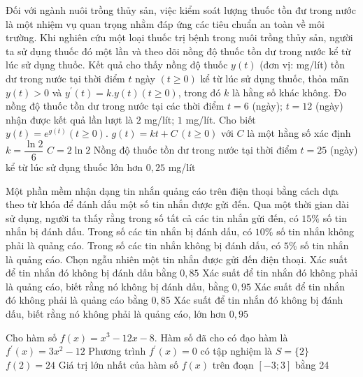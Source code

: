 \documentclass[12pt,a4paper]{article}
\begin{document}
\begin{ex}%
Đối với ngành nuôi trồng thủy sản, việc kiểm soát lượng thuốc tồn đư trong nước là một nhiệm vụ quan trọng nhằm đáp ứng các tiêu chuẩn an toàn về môi trường. Khi nghiên cứu một loại thuốc trị bệnh trong nuôi trồng thủy sản, người ta sử dụng thuốc đó một lần và theo dõi nồng độ thuốc tồn dư trong nước kể từ lúc sử dụng thuốc. Kết quả cho thấy nồng độ thuốc $y(t)$ (đơn vị: mg/lít) tồn dư trong nước tại thời điểm $t$ ngày $(t \geq 0)$ kể từ lúc sử dụng thuốc, thỏa mãn $y(t)>0$ và $y^{\prime}(t)=k .y(t)(t \geq 0)$, trong đó $k$ là hằng số khác không. Đo nồng độ thuốc tồn dư trong nước tại các thời điểm $t=6$ (ngày); $t=12$ (ngày) nhận được kết quả lần lượt là $2$ mg/lít; $1$ mg/lít. Cho biết $y(t)=e^{g(t)}(t \geq 0)$.
\choiceTF
{$g(t)=k t+C\,(t \geq 0)$ với $C$ là một hằng số xác định}
{$k=\dfrac{\ln 2}{6}$}
{$C=2 \ln 2$}
{Nồng độ thuốc tồn dư trong nước tại thời điểm $t=25$ (ngày) kể từ lúc sử dụng thuốc lớn hơn $0,25$ mg/lít}
\end{ex}

\begin{ex}%
Một phần mềm nhận dạng tin nhắn quảng cáo trên điện thoại bằng cách dựa theo từ khóa để đánh dấu một số tin nhắn được gửi đến. Qua một thời gian dài sử dụng, người ta thấy rằng trong số tất cả các tin nhắn gửi đến, có $15 \%$ số tin nhắn bị đánh dấu. Trong số các tin nhắn bị đánh dấu, có $10 \%$ số tin nhắn không phải là quảng cáo. Trong số các tin nhắn không bị đánh dấu, có $5 \%$ số tin nhắn là quảng cáo.
Chọn ngẫu nhiên một tin nhắn được gửi đến điện thoại.
\choiceTF
{Xác suất để tin nhắn đó không bị đánh dấu bằng $0,85$}
{Xác suất để tin nhắn đó không phải là quảng cáo, biết rằng nó không bị đánh dấu, bằng $0,95$}
{Xác suất để tin nhắn đó không phải là quảng cáo bằng $0,85$}
{Xác suất để tin nhắn đó không bị đánh dấu, biết rằng nó không phải là quảng cáo, lớn hơn $0,95$}
\end{ex}

\begin{ex}%
Cho hàm số $f(x)=x^3-12x-8$.
\choiceTF
{Hàm số đã cho có đạo hàm là $f^{\prime}(x)=3x^2-12$}
{Phương trình $f^{\prime}(x)=0$ có tập nghiệm là $S=\{2\}$}
{$f(2)=24$}
{Giá trị lớn nhất của hàm số $f(x)$ trên đoạn $[-3; 3]$ bằng 24}
\end{ex}
\end{document}
